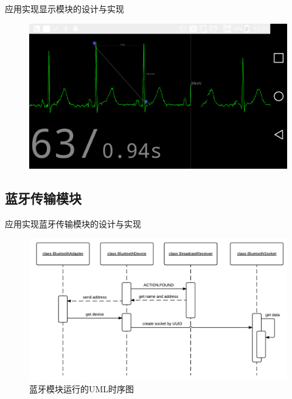 \documentclass[aspectratio=43,fleqn]{beamer}
\begin{document}
\begin{frame}{应用实现}{显示模块的设计与实现}
\begin{figure}[ht]
	\includegraphics[width=\textwidth]{fig3.png}
\end{figure}
\end{frame}

\subsection{蓝牙传输模块}
\begin{frame}{应用实现}{蓝牙传输模块的设计与实现}
\begin{figure}[ht]
	\includegraphics[width=\textwidth]{fig6.png}
	\caption{\label{fig1}蓝牙模块运行的UML时序图}
\end{figure}
\end{frame}
\end{document}
